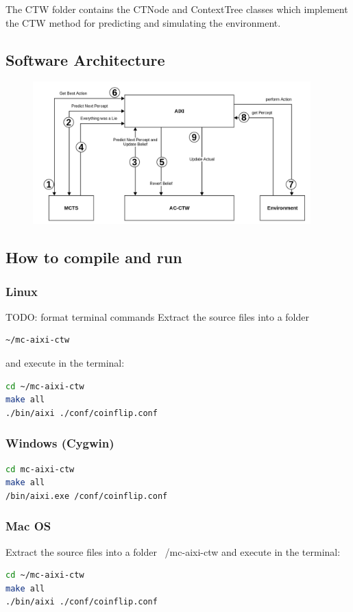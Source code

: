 \documentclass{article}
\theoremstyle{definition}
\newtheorem{primary statistics}[definition]{Primary Statistics}
\newtheorem{auxiliary statistics}[definition]{Auxiliary Statistics}
\begin{document}
The CTW folder contains the CTNode and ContextTree classes which implement the CTW method for predicting and simulating the environment.


\subsection{Software Architecture}
  \begin{figure}[h]
  \centering
\includegraphics[height=5.5cm]{soft_arch_crop}
\end{figure}


\subsection{How to compile and run}
\subsubsection*{Linux}
TODO: format terminal commands 
Extract the source files into a folder 
\begin{lstlisting}[language=bash]
~/mc-aixi-ctw 
\end{lstlisting}
 and execute in the terminal:
 
\begin{lstlisting}[language=bash]
cd ~/mc-aixi-ctw
make all
./bin/aixi ./conf/coinflip.conf
\end{lstlisting}

\subsubsection*{Windows (Cygwin)}
\begin{lstlisting}[language=bash]
cd mc-aixi-ctw
make all
/bin/aixi.exe /conf/coinflip.conf
\end{lstlisting}


\subsubsection*{Mac OS}
Extract the source files into a folder ~/mc-aixi-ctw and execute in the terminal:
\begin{lstlisting}[language=bash]
cd ~/mc-aixi-ctw
make all
./bin/aixi ./conf/coinflip.conf
\end{lstlisting}
\end{document}
